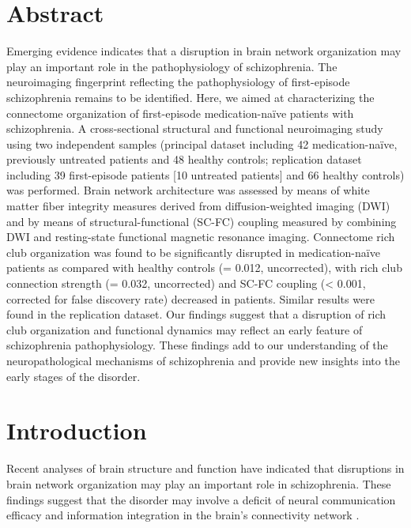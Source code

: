 \begin{refsection}
\section*{Abstract}
Emerging evidence indicates that a disruption in brain network organization may play an important role in the pathophysiology of schizophrenia. The neuroimaging fingerprint reflecting the pathophysiology of first-episode schizophrenia remains to be identified. Here, we aimed at characterizing the connectome organization of first-episode medication-na\"{i}ve patients with schizophrenia. A cross-sectional structural and functional neuroimaging study using two independent samples (principal dataset including 42 medication-na\"{i}ve, previously untreated patients and 48 healthy controls; replication dataset including 39 first-episode patients [10 untreated patients] and 66 healthy controls) was performed. Brain network architecture was assessed by means of white matter fiber integrity measures derived from diffusion-weighted imaging (DWI) and by means of structural-functional (SC-FC) coupling measured by combining DWI and resting-state functional magnetic resonance imaging. Connectome rich club organization was found to be significantly disrupted in medication-na\"{i}ve patients as compared with healthy controls (\pval = 0.012, uncorrected), with rich club connection strength (\pval = 0.032, uncorrected) and SC-FC coupling (\pval < 0.001, corrected for false discovery rate) decreased in patients. Similar results were found in the replication dataset. Our findings suggest that a disruption of rich club organization and functional dynamics may reflect an early feature of schizophrenia pathophysiology. These findings add to our understanding of the neuropathological mechanisms of schizophrenia and provide new insights into the early stages of the disorder.

\section*{Introduction}
Recent analyses of brain structure \citep{Brugger2017HeterogeneityAH,Dietsche2017StructuralBC} and function \citep{Dong2018DysfunctionOL} have indicated that disruptions in brain network organization may play an important role in schizophrenia. These findings suggest that the disorder may involve a deficit of neural communication efficacy and information integration in the brain's connectivity network \citep{vanDenHeuvel2010AberrantFA}.


\end{refsection}

